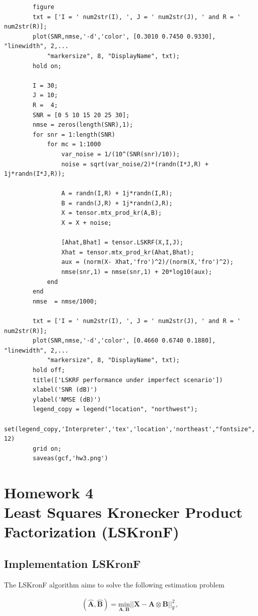 \documentclass[a4paper,10pt]{article}
\begin{document}
\begin{verbatim}
        figure
        txt = ['I = ' num2str(I), ', J = ' num2str(J), ' and R = ' num2str(R)];
        plot(SNR,nmse,'-d','color', [0.3010 0.7450 0.9330], "linewidth", 2,...
            "markersize", 8, "DisplayName", txt);
        hold on;

        I = 30;
        J = 10;
        R =  4;
        SNR = [0 5 10 15 20 25 30];
        nmse = zeros(length(SNR),1);
        for snr = 1:length(SNR)
            for mc = 1:1000
                var_noise = 1/(10^(SNR(snr)/10));
                noise = sqrt(var_noise/2)*(randn(I*J,R) + 1j*randn(I*J,R));
                
                A = randn(I,R) + 1j*randn(I,R);
                B = randn(J,R) + 1j*randn(J,R);
                X = tensor.mtx_prod_kr(A,B);
                X = X + noise;
                
                [Ahat,Bhat] = tensor.LSKRF(X,I,J);
                Xhat = tensor.mtx_prod_kr(Ahat,Bhat);
                aux = (norm(X- Xhat,'fro')^2)/(norm(X,'fro')^2);
                nmse(snr,1) = nmse(snr,1) + 20*log10(aux);
            end
        end
        nmse  = nmse/1000;

        txt = ['I = ' num2str(I), ', J = ' num2str(J), ' and R = ' num2str(R)];
        plot(SNR,nmse,'-d','color', [0.4660 0.6740 0.1880], "linewidth", 2,...
            "markersize", 8, "DisplayName", txt);
        hold off;
        title(['LSKRF performance under imperfect scenario'])
        xlabel('SNR (dB)')
        ylabel('NMSE (dB)')
        legend_copy = legend("location", "northwest");
        set(legend_copy,'Interpreter','tex','location','northeast',"fontsize", 12)
        grid on;
        saveas(gcf,'hw3.png')
    \end{verbatim}
    
\newpage
\section*{Homework 4 \\ Least Squares Kronecker Product Factorization (LSKronF)}

    \subsection*{Implementation LSKronF}

    The LSKronF algorithm aims to solve the following estimation problem 

    \begin{align}
        \left(\hat{\boldsymbol{A}}, \hat{\boldsymbol{B}}\right) = \underset{\boldsymbol{A}, \boldsymbol{B}}{\text{min}} \left|\left| \boldsymbol{X} - \boldsymbol{A} \otimes \boldsymbol{B} \right|\right|^2_{\text{F}},
    \end{align}
\end{document}

